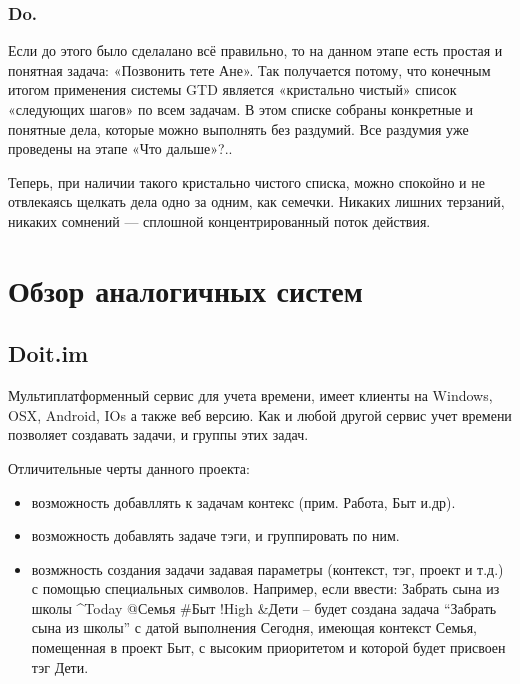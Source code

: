 \subsubsection{Do. }

Если до этого было сделалано всё правильно, то на данном этапе есть простая и понятная задача: «Позвонить тете Ане».
Так получается потому, что конечным итогом применения системы GTD является «кристально чистый» список «следующих шагов» по всем задачам. В этом списке собраны конкретные и понятные дела, которые можно выполнять без раздумий. Все раздумия уже проведены на этапе «Что дальше»?..

Теперь, при наличии такого кристально чистого списка, можно спокойно и не отвлекаясь щелкать дела одно за одним, как семечки. Никаких лишних терзаний, никаких сомнений — сплошной концентрированный поток действия. 

\section{Обзор аналогичных систем} 
\label{sec:practice:analogs}

\subsection{Doit.im}
\label{sub:practice:analogs:doit}
Мультиплатформенный  сервис для учета времени, имеет клиенты на Windows, OSX, Android, IOs а также веб версию. Как и любой другой сервис учет времени позволяет создавать задачи, и группы этих задач.

Отличительные черты данного проекта:

\begin{itemize}
  \item возможность добавллять к задачам контекс (прим. Работа, Быт и.др).
  \item возможность добавлять задаче тэги, и группировать по ним.
  \item возмжность создания задачи задавая параметры (контекст, тэг, проект и т.д.) с помощью специальных символов. Например, если ввести: Забрать сына из школы \string^Today @Семья \#Быт !High \&Дети –  будет создана задача “Забрать сына из школы” с датой выполнения Сегодня, имеющая контекст Семья, помещенная в проект Быт, с высоким приоритетом и которой будет присвоен тэг Дети.
\end{itemize}

